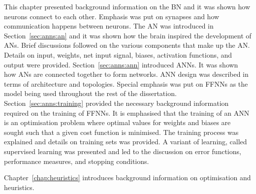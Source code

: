 This chapter presented background information on the \ac{BN} and it was shown
how neurons connect to each other. Emphasis was put on synapses
and how communication happens between neurons. The \ac{AN} was introduced in
Section~\ref{sec:anns:an} and it was shown how the brain inspired the
development of \acp{AN}. Brief discussions followed on the various components
that make up the \ac{AN}. Details on input, weights, net
input signal, biases, activation functions, and
output were provided.  Section~\ref{sec:anns:ann} introduced \acp{ANN}. It was
shown how \acp{AN} are connected together to form networks. \ac{ANN} design was
described in terms of architecture and topologies. Special emphasis was put on
\acp{FFNN} as the model being used throughout the rest of the dissertation.
Section~\ref{sec:anns:training} provided the necessary background information
required on the training of \acp{FFNN}. It is emphasised that the training of an
\ac{ANN} is an optimisation problem where optimal values for weights and biases
are sought such that a given cost function is minimised. The training process
was explained and details on training sets was provided. A variant of learning,
called supervised learning was presented and led to
the discussion on error functions, performance measures, and stopping
conditions.

Chapter~\ref{chap:heuristics} introduces background information on optimisation
and heuristics.
